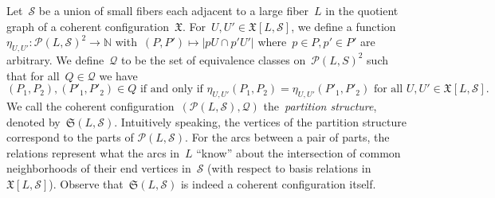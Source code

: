 \documentclass[english,a4paper]{article}
\theoremstyle{plain}
\theoremstyle{definition}
\newcommand{\Nat}{\ensuremath{\mathbb{N}}}
\newcommand{\coherentConfig}{\ensuremath{\mathfrak{X}}}
\newcommand{\interspace}[2]{\ensuremath{\coherentConfig[#1,#2]}}
\newcommand{\equivalenceClasses}[1]{\ensuremath{\mathcal{P}(#1)}}
\newcommand{\partitionStructure}[1]{\ensuremath{\mathfrak{S}(#1)}}
\begin{document}
Let~$\mathcal{S}$ be a union of small fibers each adjacent to a large fiber~$L$ in the quotient graph of a coherent configuration~$\coherentConfig$.
For~$U,U' \in \interspace{L}{\mathcal{S}}$, we define a function~$\eta_{U,U'} \colon \equivalenceClasses{L,\mathcal{S}}^2 \longrightarrow \Nat$ with~$(P,P') \mapsto | p U \cap p' U'|$ where~$p \in P,p' \in P'$ are arbitrary.
We define~$\mathcal{Q}$ to be the set of equivalence classes on~$\equivalenceClasses{L,S}^2$ such that for all~$Q \in \mathcal{Q}$ we have
\[
    (P_1,P_2),(P'_1,P'_2) \in Q \text{ if and only if } \eta_{U,U'}(P_1,P_2) = \eta_{U,U'}(P'_1,P'_2) \text{ for all } U,U' \in \interspace{L}{\mathcal{S}}.
\]
We call the coherent configuration~$(\equivalenceClasses{L,\mathcal{S}}, \mathcal{Q})$ the~\emph{partition structure}, denoted by~$\partitionStructure{L,\mathcal{S}}$.
Intuitively speaking, the vertices of the partition structure correspond to the parts of $\equivalenceClasses{L,\mathcal{S}}$. For the arcs between a pair of parts, the relations represent what the arcs in~$L$ ``know'' about the intersection of common neighborhoods of their end vertices in~$\mathcal{S}$ (with respect to basis relations in~$\interspace{L}{\mathcal{S}}$).
Observe that~$\partitionStructure{L,\mathcal{S}}$ is indeed a coherent configuration itself.
\end{document}
